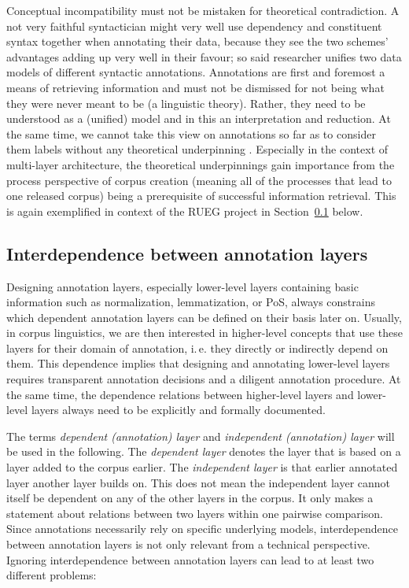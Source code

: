 \documentclass[output=paper,colorlinks,citecolor=brown]{langscibook}
\begin{document}
Conceptual incompatibility must not be mistaken for theoretical contradiction. A not very faithful syntactician might very well use dependency and constituent syntax together when annotating their data, because they see the two schemes' advantages adding up very well in their favour; so said researcher unifies two data models of different syntactic annotations. Annotations are first and foremost a means of retrieving information and must not be dismissed for not being what they were never meant to be (a linguistic theory). Rather, they need to be understood as a (unified) model and in this an interpretation and reduction. At the same time, we cannot take this view on annotations so far as to consider them labels without any theoretical underpinning \parencite{Bubenhofer2018}. Especially in the context of multi-layer architecture, the theoretical underpinnings gain importance from the process perspective of corpus creation (meaning all of the processes that lead to one released corpus) being a prerequisite of successful information retrieval. This is again exemplified in context of the RUEG project in Section~\ref{sec:shadrovaetal:interdependence} below. 

\subsection{Interdependence between annotation layers}\label{sec:shadrovaetal:interdependence}
Designing annotation layers, especially lower-level layers containing basic information such as normalization, lemmatization, or PoS, always constrains which dependent annotation layers can be defined on their basis later on. Usually, in corpus linguistics, we are then interested in higher-level concepts that use these layers for their domain of annotation, i.\,e. they directly or indirectly depend on them. This dependence implies that designing and annotating lower-level layers requires transparent annotation decisions and a diligent annotation procedure. At the same time, the dependence relations between higher-level layers and lower-level layers always need to be explicitly and formally documented.

The terms \textit{dependent (annotation) layer} and \textit{independent (annotation) layer} will be used in the following. The \textit{dependent layer} denotes the layer that is based on a layer added to the corpus earlier. The \textit{independent layer} is that earlier annotated layer another layer builds on. This does not mean the independent layer cannot itself be dependent on any of the other layers in the corpus. It only makes a statement about relations between two layers within one pairwise comparison. Since annotations necessarily rely on specific underlying models, interdependence between annotation layers is not only relevant from a technical perspective.
Ignoring interdependence between annotation layers can lead to at least two different problems:
\end{document}
